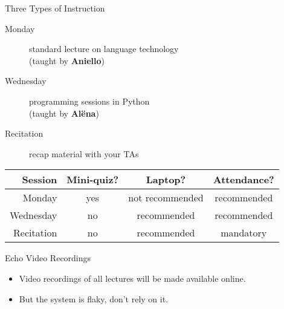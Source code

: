 \documentclass[professionalfonts, xcolor={usenames,svgnames,x11names,table}]{beamer}
\begin{document}
\begin{frame}{Three Types of Instruction}
    \begin{description}
        \item[Monday] standard lecture on language technology \\(taught by \textbf{Aniello})
        \item[Wednesday] programming sessions in Python\\  (taught by \textbf{Al{\"e}na})
        \item[Recitation] recap material with your TAs
    \end{description}

    \begin{center}
        \begin{tabular}{rccc}
                \toprule
                \textbf{Session} & \textbf{Mini-quiz?} & \textbf{Laptop?} & \textbf{Attendance?}\\
                \midrule
                Monday & yes & not recommended & recommended\\
                Wednesday & no & recommended & recommended\\
                Recitation & no & recommended & mandatory\\
                \bottomrule
        \end{tabular}
    \end{center}

    \pause
    \begin{block}{Echo Video Recordings}
        \begin{itemize}
            \item Video recordings of all lectures will be made available online.
            \item But the system is flaky, don't rely on it.
        \end{itemize}
    \end{block}
\end{frame}
\end{document}
